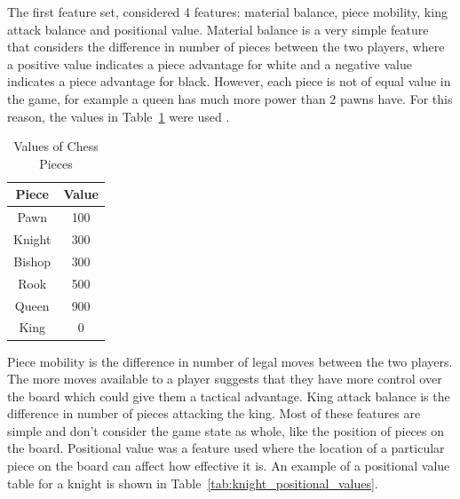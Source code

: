 The first feature set, considered 4 features: material balance, piece mobility, king attack balance and positional value. Material balance is a very simple feature that considers the difference in number of pieces between the two players, where a positive value indicates a piece advantage for white and a negative value indicates a piece advantage for black. However, each piece is not of equal value in the game, for example a queen has much more power than 2 pawns have. For this reason, the values in Table~\ref{tab:piece_values} were used \cite{shannonXXIIProgrammingComputer1950}. 


\begin{table}[h]
    \centering
    \begin{tabular}{|c|c|}
        \hline
        \textbf{Piece} & \textbf{Value} \\
        \hline
        Pawn & 100 \\
        Knight & 300 \\
        Bishop & 300 \\
        Rook & 500 \\
        Queen & 900 \\
        King & 0 \\
        \hline
    \end{tabular}
    \caption{Values of Chess Pieces}
    \label{tab:piece_values}
\end{table}

Piece mobility is the difference in number of legal moves between the two players. The more moves available to a player suggests that they have more control over the board which could give them a tactical advantage. King attack balance is the difference in number of pieces attacking the king. Most of these features are simple and don't consider the game state as whole, like the position of pieces on the board. Positional value was a feature used where the location of a particular piece on the board can affect how effective it is. An  example of a positional value table for a knight is shown in Table~\ref{tab:knight_positional_values}.

